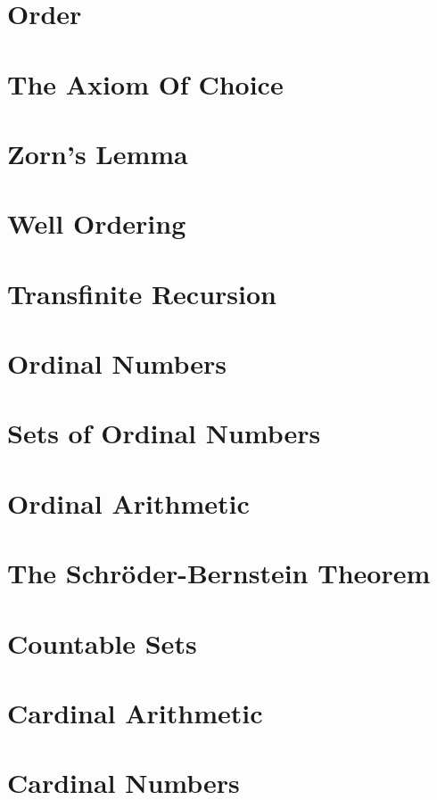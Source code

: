 \documentclass[fontsize=12pt,b5paper,pagesize=auto,openany]{book}
\theoremstyle{axiom}
\theoremstyle{exc}
\begin{document}
\chapter{Order}


\chapter{The Axiom Of Choice}
\label{ch:choice}


\chapter{Zorn's Lemma}


\chapter{Well Ordering}


\chapter{Transfinite Recursion} 


\chapter{Ordinal Numbers}


\chapter{Sets of Ordinal Numbers}


\chapter{Ordinal Arithmetic}


\chapter{The Schröder-Bernstein Theorem}


\chapter{Countable Sets}


\chapter{Cardinal Arithmetic}


\chapter{Cardinal Numbers}


\fancyhead[RE, LO]{}

\printindex
\end{document}
